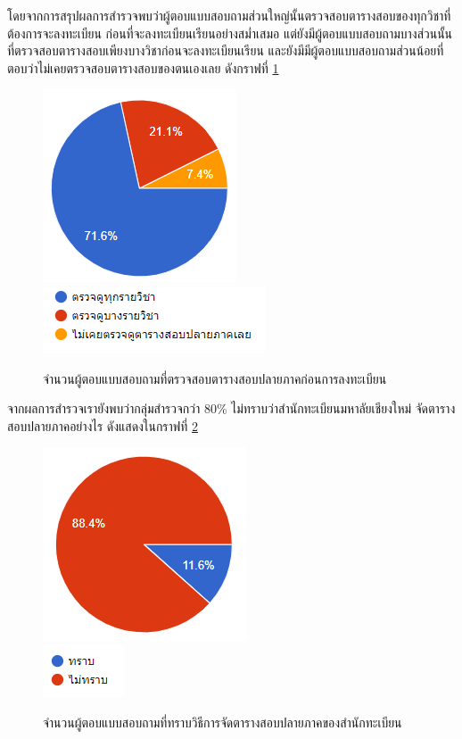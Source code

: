 โดยจากการสรุปผลการสำรวจพบว่าผู้ตอบแบบสอบถามส่วนใหญ่นั้นตรวจสอบตารางสอบของทุกวิชาที่ต้องการจะลงทะเบียน
ก่อนที่จะลงทะเบียนเรียนอย่างสม่ำเสมอ แต่ยังมีผู้ตอบแบบสอบถามบางส่วนนั้นที่ตรวจสอบตารางสอบเพียงบางวิชาก่อนจะลงทะเบียนเรียน และยังมีมีผู้ตอบแบบสอบถามส่วนน้อยที่ตอบว่าไม่เคยตรวจสอบตารางสอบของตนเองเลย ดังกราฟที่ \ref{fig:check_before_enrollment}
\begin{figure}
  \begin{center}
    \includegraphics{images/checking_schedule_before_enrollment.png}\\[2ex]
    \includegraphics{images/legend_for_checking_schedule_before_enrollment.png}
  \end{center}
  \caption[Poem]{จำนวนผู้ตอบแบบสอบถามที่ตรวจสอบตารางสอบปลายภาคก่อนการลงทะเบียน}
  \label{fig:check_before_enrollment}     
\end{figure}
จากผลการสำรวจเรายังพบว่ากลุ่มสำรวจกว่า 80\% ไม่ทราบว่าสำนักทะเบียนมหาลัยเชียงใหม่ จัดตารางสอบปลายภาคอย่างไร ดังแสดงในกราฟที่ \ref{fig:registration_exam}
\begin{figure}
  \begin{center}
    \includegraphics{images/registration_exam.png}\\[2ex]
    \includegraphics{images/legend_for_registration_exam.png}
  \end{center}
  \caption[Poem]{จำนวนผู้ตอบแบบสอบถามที่ทราบวิธีการจัดตารางสอบปลายภาคของสำนักทะเบียน}
  \label{fig:registration_exam}     
\end{figure}

